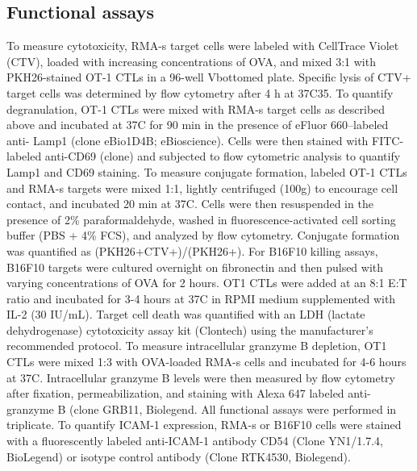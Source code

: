 \subsection{Functional assays}
To measure cytotoxicity, RMA-s target cells were labeled with CellTrace Violet (CTV), loaded with increasing concentrations of OVA, and mixed 3:1 with PKH26-stained OT-1 CTLs in a 96-well Vbottomed plate. Specific lysis of CTV+ target cells was determined by flow cytometry after 4 h at 37\degree C35. To quantify degranulation, OT-1 CTLs were mixed with RMA-s target cells as described above and incubated at 37\degree C for 90 min in the presence of eFluor 660–labeled anti- Lamp1 (clone eBio1D4B; eBioscience). Cells were then stained with FITC-labeled anti-CD69 (clone) and subjected to flow cytometric analysis to quantify Lamp1 and CD69 staining. To measure conjugate formation, labeled OT-1 CTLs and RMA-s targets were mixed 1:1, lightly centrifuged (100g) to encourage cell contact, and incubated 20 min at 37\degree C. Cells were then resuspended in the presence of 2\% paraformaldehyde, washed in fluorescence-activated cell sorting buffer (PBS + 4\% FCS), and analyzed by flow cytometry. Conjugate formation was quantified as (PKH26+CTV+)/(PKH26+). For B16F10 killing assays, B16F10 targets were cultured overnight on fibronectin and then pulsed with varying concentrations of OVA for 2 hours. OT1 CTLs were added at an 8:1 E:T ratio and incubated for 3-4 hours at 37\degree C in RPMI medium supplemented with IL-2 (30 IU/mL). Target cell death was quantified with an LDH (lactate dehydrogenase) cytotoxicity assay kit (Clontech) using the manufacturer’s recommended protocol. To measure intracellular granzyme B depletion, OT1 CTLs were mixed 1:3 with OVA-loaded RMA-s cells and incubated for 4-6 hours at 37\degree C. Intracellular granzyme B levels were then measured by flow cytometry after fixation, permeabilization, and staining with Alexa 647 labeled anti-granzyme B (clone  GRB11, Biolegend. All functional assays were performed in triplicate. To quantify ICAM-1 expression, RMA-s or B16F10 cells were stained with a fluorescently labeled anti-ICAM-1 antibody CD54 (Clone YN1/1.7.4, BioLegend) or isotype control antibody (Clone RTK4530, Biolegend). 

